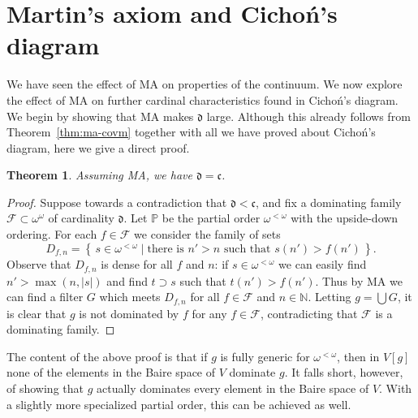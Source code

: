 \documentclass[11pt,oneside,a4paper]{amsbook}
\newcommand{\set}[1]{\left\{\,#1\,\right\}}
\newcommand{\N}{\mathbb N}
\newcommand{\PP}{\mathbb P}
\theoremstyle{definition}
\theoremstyle{plain}
\newtheorem{theorem}{Theorem}[section]
\theoremstyle{definition}
\theoremstyle{remark}
\numberwithin{equation}{section}
\numberwithin{figure}{section}
\begin{document}



\newpage
\section{Martin's axiom and Cicho\'n's diagram}

We have seen the effect of MA on properties of the continuum. We now explore the effect of MA on further cardinal characteristics found in Cicho\'n's diagram. We begin by showing that MA makes $\mathfrak d$ large. Although this already follows from Theorem~\ref{thm:ma-covm} together with all we have proved about Cicho\'n's diagram, here we give a direct proof.

\begin{theorem}
  \label{thm:ma-d}
  Assuming MA, we have $\mathfrak d=\mathfrak c$.
\end{theorem}

\begin{proof}
  Suppose towards a contradiction that $\mathfrak d<\mathfrak c$, and fix a dominating family $\mathcal F\subset\omega^\omega$ of cardinality $\mathfrak d$. Let $\PP$ be the partial order $\omega^{<\omega}$ with the upside-down ordering. For each $f\in\mathcal F$ we consider the family of sets
  \[D_{f,n}=\set{s\in\omega^{<\omega}\mid\text{there is $n'>n$ such that $s(n')>f(n')$}}\text{.}
  \]
  Observe that $D_{f,n}$ is dense for all $f$ and $n$: if $s\in\omega^{<\omega}$ we can easily find $n'>\max(n,|s|)$ and find $t\supset s$ such that $t(n')>f(n')$. Thus by MA we can find a filter $G$ which meets $D_{f,n}$ for all $f\in\mathcal F$ and $n\in\N$. Letting $g=\bigcup G$, it is clear that $g$ is not dominated by $f$ for any $f\in\mathcal F$, contradicting that $\mathcal F$ is a dominating family.
\end{proof}

The content of the above proof is that if $g$ is fully generic for $\omega^{<\omega}$, then in $V[g]$ none of the elements in the Baire space of $V$ dominate $g$. It falls short, however, of showing that $g$ actually dominates every element in the Baire space of $V$. With a slightly more specialized partial order, this can be achieved as well.
\end{document}

